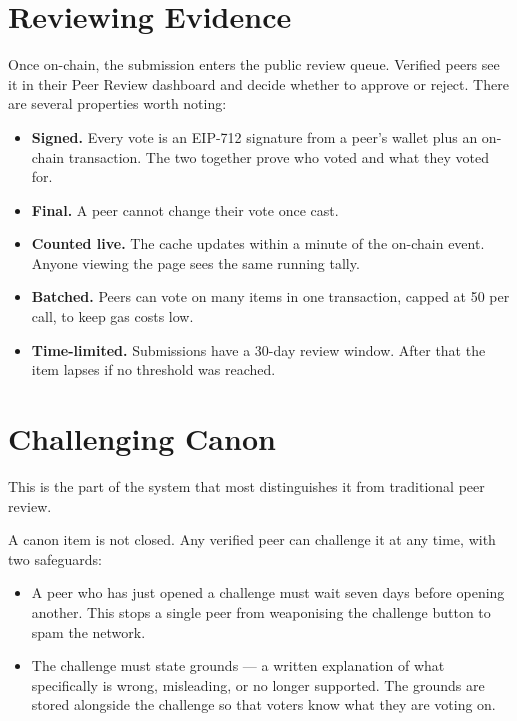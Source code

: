 \documentclass[11pt,a4paper]{article}
\begin{document}
\section{Reviewing Evidence}

Once on-chain, the submission enters the public review queue. Verified
peers see it in their Peer Review dashboard and decide whether to
approve or reject. There are several properties worth noting:

\begin{itemize}[leftmargin=1.5em]
  \item \textbf{Signed.} Every vote is an EIP-712 signature from a
        peer's wallet plus an on-chain transaction. The two together
        prove who voted and what they voted for.
  \item \textbf{Final.} A peer cannot change their vote once cast.
  \item \textbf{Counted live.} The cache updates within a minute of
        the on-chain event. Anyone viewing the page sees the same
        running tally.
  \item \textbf{Batched.} Peers can vote on many items in one
        transaction, capped at 50 per call, to keep gas costs low.
  \item \textbf{Time-limited.} Submissions have a 30-day review
        window. After that the item lapses if no threshold was
        reached.
\end{itemize}

\section{Challenging Canon}

This is the part of the system that most distinguishes it from
traditional peer review.

A canon item is not closed. Any verified peer can challenge it at
any time, with two safeguards:

\begin{itemize}[leftmargin=1.5em]
  \item A peer who has just opened a challenge must wait seven days
        before opening another. This stops a single peer from
        weaponising the challenge button to spam the network.
  \item The challenge must state grounds --- a written explanation
        of what specifically is wrong, misleading, or no longer
        supported. The grounds are stored alongside the challenge so
        that voters know what they are voting on.
\end{itemize}
\end{document}

